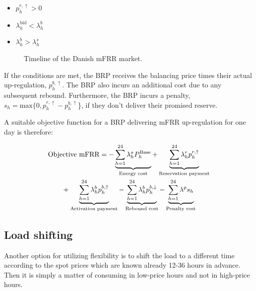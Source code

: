 \begin{itemize}
    \item $p_{h}^{r,\uparrow} > 0$
    \item $\lambda_{h}^{\text{bid}} <  \lambda_{h}^{b}$
    \item $\lambda_{h}^{b} > \lambda_{h}^{s}$
\end{itemize}



\begin{figure}[!t]
    \centering
    
    \caption{Timeline of the Danish mFRR market.}
    \label{fig:timeline_mfrr}
\end{figure}


If the conditions are met, the BRP receives the balancing price times their actual up-regulation, $p_{h}^{b,\uparrow}$. The BRP also incurs an additional cost due to any subsequent rebound. Furthermore, the BRP incurs a penalty, $s_{h} = \text{max}\{0, p_{h}^{r,\uparrow} - p_{h}^{b,\uparrow}$\}, if they don't deliver their promised reserve.

A suitable objective function for a BRP delivering mFRR up-regulation for one day is therefore:

\begin{align}\label{eq:mFRRObjective}
     & \text{Objective mFRR} = - \underbrace{\sum_{h=1}^{24} \lambda^{s}_{h}P^{\text{Base}}_{h}}_{\textrm{Energy cost}} + \underbrace{\sum_{h=1}^{24}\lambda_{h}^{r} p^{r, \uparrow}_{h}}_{\textrm{Reservation payment}}  \notag \\ & \quad \quad + \underbrace{\sum_{h=1}^{24}  \lambda_{h}^{b} p^{b,\uparrow}_{h}}_{\textrm{Activation payment}} - \underbrace{\sum_{h=1}^{24}  \lambda_{h}^{b} p^{b,\downarrow}_{h}}_{\textrm{Rebound cost}} - \underbrace{ \sum_{h=1}^{24}  \lambda^{p}s_{h}}_{\textrm{Penalty cost}}
\end{align}


\subsection{Load shifting}

Another option for utilizing flexibility is to shift the load to a different time according to the spot prices which are known already 12-36 hours in advance. Then it is simply a matter of consuming in low-price hours and not in high-price hours.

